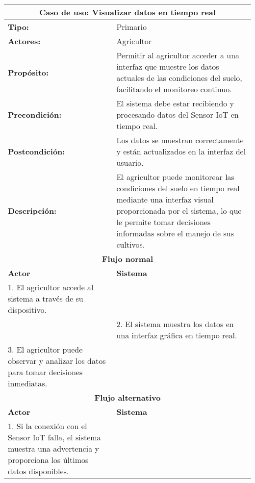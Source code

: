 \begin{longtable}{|p{5cm}|p{5cm}|}
	\hline
	\multicolumn{2}{|c|}{\textbf{Caso de uso: Visualizar datos en tiempo real}} \\
	\hline
	\textbf{Tipo:} & Primario \\
	\hline
	\textbf{Actores:} & Agricultor \\
	\hline
	\textbf{Propósito:} & Permitir al agricultor acceder a una interfaz que muestre los datos actuales de las condiciones del suelo, facilitando el monitoreo continuo. \\
	\hline
	\textbf{Precondición:} & El sistema debe estar recibiendo y procesando datos del Sensor IoT en tiempo real. \\
	\hline
	\textbf{Postcondición:} & Los datos se muestran correctamente y están actualizados en la interfaz del usuario. \\
	\hline
	\textbf{Descripción:} & El agricultor puede monitorear las condiciones del suelo en tiempo real mediante una interfaz visual proporcionada por el sistema, lo que le permite tomar decisiones informadas sobre el manejo de sus cultivos. \\
	\hline
	\multicolumn{2}{|c|}{\textbf{Flujo normal}} \\
	\hline
	\textbf{Actor} & \textbf{Sistema} \\
	\hline
	1. El agricultor accede al sistema a través de su dispositivo. & \\
	\hline
	& 2. El sistema muestra los datos en una interfaz gráfica en tiempo real. \\
	\hline
	3. El agricultor puede observar y analizar los datos para tomar decisiones inmediatas. & \\
	\hline
	\multicolumn{2}{|c|}{\textbf{Flujo alternativo}} \\
	\hline
	\textbf{Actor} & \textbf{Sistema} \\
	\hline
	1. Si la conexión con el Sensor IoT falla, el sistema muestra una advertencia y proporciona los últimos datos disponibles. & \\
	\hline
\end{longtable}

